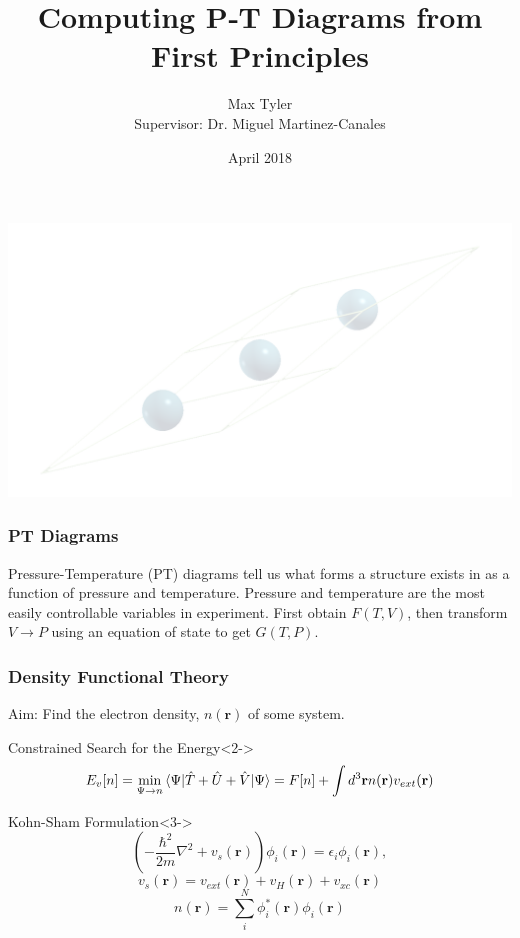 \documentclass{beamer}
\title{Computing P‐T Diagrams from First Principles}
\author[Max Tyler]{Max Tyler\\{\small Supervisor: Dr. Miguel Martinez-Canales}}
\institute{The University of Edinburgh}
\date{April 2018}
\begin{document}
{ 
\usebackgroundtemplate
{
	\includegraphics[width=\paperwidth,height=\paperheight]{na9rlarge.png}
}
\frame{\titlepage}
}
 
\begin{frame}
	\frametitle{PT Diagrams}
	Pressure-Temperature (PT) diagrams tell us what forms a structure exists in as a function of pressure and temperature.
	\pause
	\newline
	\newline
	Pressure and temperature are the most easily controllable variables in experiment.
	\pause
	\newline
	\newline
	First obtain $F(T, V)$, then transform $V\rightarrow P$ using an equation of state to get $G(T, P)$.
\end{frame}

\begin{frame}
	\frametitle{Density Functional Theory}
	Aim: Find the electron density, $n(\mathbf r)$ of some system.
	\begin{block}{Constrained Search for the Energy}<2->
		$$E_{v}[n] = \min_{\Psi \rightarrow n} \braket{\Psi|\hat T+\hat U + \hat V|\Psi} = F[n] + \int d^3\mathbf r n(\mathbf r) v_{ext}(\mathbf r)$$
	\end{block}
	\begin{block}{Kohn-Sham Formulation}<3->
		$$\left(-\frac{\hbar^2}{2m}\nabla^2+v_s(\mathbf r)\right)\phi_i(\mathbf r) = \epsilon_i \phi_i(\mathbf r),$$
		$$v_s(\mathbf r) = v_{ext}(\mathbf r) + v_H(\mathbf r) + v_{xc}(\mathbf r)$$
		$$n(\mathbf r) = \sum_i^N\phi^*_i(\mathbf r)\phi_i(\mathbf r)$$	
	\end{block}
\end{frame}
\end{document}
